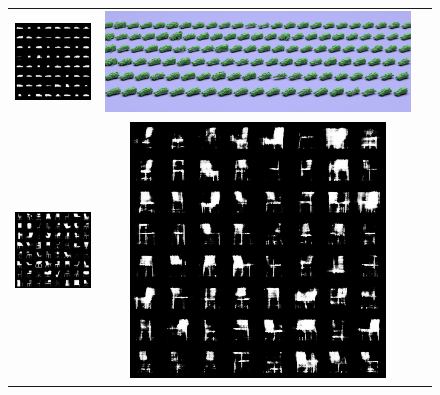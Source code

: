 \begin{figure}
\begin{center}
\begin{tabular}{ccc}
    \includegraphics[height=\fh]{fig/car/600.png} & 
    \includegraphics[height=\fh]{fig/car/output.png} \\
    \includegraphics[height=\fh]{fig/chair/samples.png} & 
    \includegraphics[height=\fh]{fig/chair/550.png} & 

\end{tabular}
\end{center}
\end{figure}
